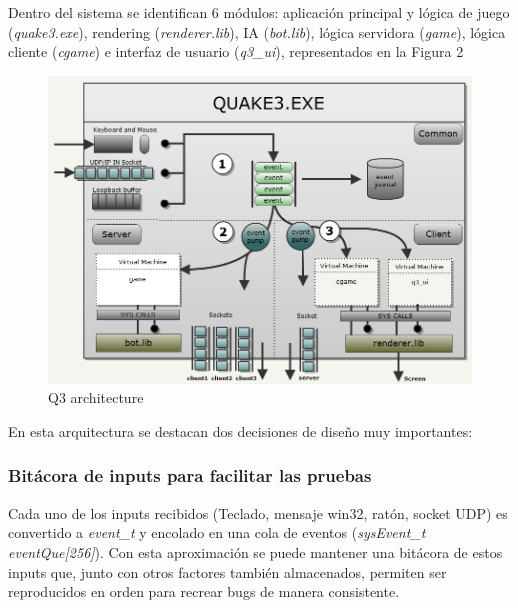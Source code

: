 \documentclass[a4paper,12pt]{report}
\begin{document}
	Dentro del sistema se identifican 6 módulos: aplicación principal y lógica de juego (\textit{quake3.exe}), rendering (\textit{renderer.lib}), IA (\textit{bot.lib}), lógica servidora (\textit{game}), lógica cliente (\textit{cgame}) e interfaz de usuario (\textit{q3\_ui}), representados en la Figura 2  

		\begin{center}
			\begin{figure}[h]
				\includegraphics[width=1\textwidth]{images/q3_architecture}
				\caption{Q3 architecture}
				\label{figarchitecture}
			\end{figure}
		\end{center}
	
	En esta arquitectura se destacan dos decisiones de diseño muy importantes:
	
	\subsubsection{Bitácora de inputs para facilitar las pruebas}
	
	Cada uno de los inputs recibidos (Teclado, mensaje win32, ratón, socket UDP) es convertido a \textit{event\_t} y encolado en una cola de eventos (\textit{sysEvent\_t eventQue[256]}). Con esta aproximación se puede mantener una bitácora de estos inputs que, junto con otros factores también almacenados, permiten ser reproducidos en orden para recrear bugs de manera consistente. \cite{johncplan}\\
	
\end{document}
